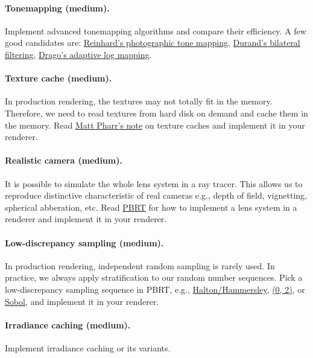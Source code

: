\paragraph{Tonemapping (medium).}
Implement advanced tonemapping algorithms and compare their efficiency. A few good candidates are: \href{https://www-old.cs.utah.edu/docs/techreports/2002/pdf/UUCS-02-001.pdf}{Reinhard's photographic tone mapping}, \href{http://people.csail.mit.edu/fredo/PUBLI/Siggraph2002/}{Durand's bilateral filtering}, \href{https://resources.mpi-inf.mpg.de/tmo/logmap/}{Drago's adaptive log mapping}.

\paragraph{Texture cache (medium).}
In production rendering, the textures may not totally fit in the memory. Therefore, we need to read textures from hard disk on demand and cache them in the memory. Read \href{https://pbrt.org/texcache.pdf}{Matt Pharr's note} on texture caches and implement it in your renderer.

\paragraph{Realistic camera (medium).}
It is possible to simulate the whole lens system in a ray tracer. This allows us to reproduce distinctive characteristic of real cameras e.g., depth of field, vignetting, spherical abberation, etc. Read \href{https://www.pbr-book.org/3ed-2018/Camera_Models/Realistic_Cameras}{PBRT} for how to implement a lens system in a renderer and implement it in your renderer.

\paragraph{Low-discrepancy sampling (medium).}
In production rendering, independent random sampling is rarely used. In practice, we always apply stratification to our random number sequences. Pick a low-discrepancy sampling sequence in PBRT, e.g., \href{https://www.pbr-book.org/3ed-2018/Sampling_and_Reconstruction/The_Halton_Sampler.html}{Halton/Hammersley}, \href{https://www.pbr-book.org/3ed-2018/Sampling_and_Reconstruction/(0,_2)-Sequence_Sampler.html}{(0, 2)}, or \href{https://www.pbr-book.org/3ed-2018/Sampling_and_Reconstruction/Sobol_Sampler.html}{Sobol}, and implement it in your renderer.

\paragraph{Irradiance caching (medium).}
Implement irradiance caching or its variants.


